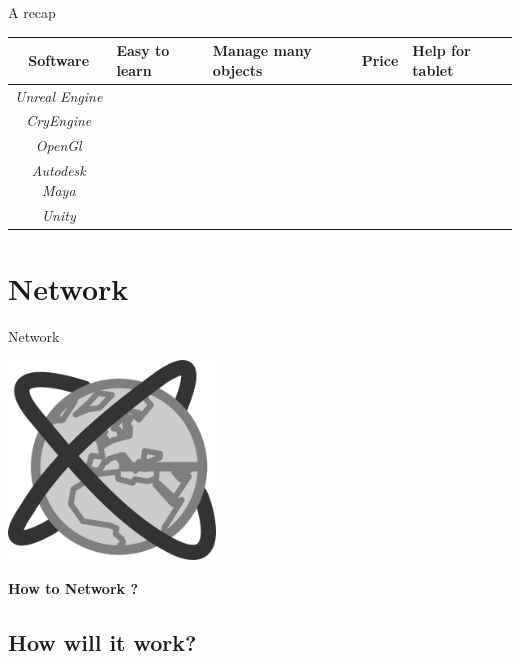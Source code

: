 \documentclass[a4paper,10pt]{beamer}
\begin{document}
			\begin{frame}{A recap}
				\begin{tabularx}{300pt}{|c|X|X|c|X|}
					\hline
					\textbf{Software} & \textbf{Easy to learn} & \textbf{Manage many objects} & \textbf{Price} & \textbf{Help for tablet}\\
					\hline
					\textit{Unreal Engine} & \color{green}{\checkmark} & \color{green}{\checkmark} & \color{orange}{19\euro/month + 5 \%} & \color{red}{$\times$}\\
					\hline
					\textit{CryEngine} & \color{green}{\checkmark} & \color{green}{\checkmark} & \color{orange}{9.99\euro/month} & \color{orange}{$\sim$}\\
					\hline
					\textit{OpenGl} & \color{red}{$\times$} & \color{orange}{$\sim$} & \color{green}{0\euro} & \color{red}{$\times$}\\
					\hline
					\textit{Autodesk Maya} & \color{red}{$\times$} & \color{green}{\checkmark} & \color{red}{\$185.00/month} & \color{orange}{$\sim$}\\
					\hline
					\textit{Unity} & \color{green}{\checkmark} & \color{green}{\checkmark} & \color{green}{0\euro : free licence} & \color{green}{\checkmark} \\
					\hline
				\end{tabularx}
			\end{frame}
			
	\section{Network}
			
			\begin{frame}{Network}
				\centerline{\includegraphics[height=150pt]{images/network/network.png}}
				
				\centerline{\textbf{How to Network ?}}
			\end{frame}
			
		\subsection{How will it work?}
			
\end{document}
